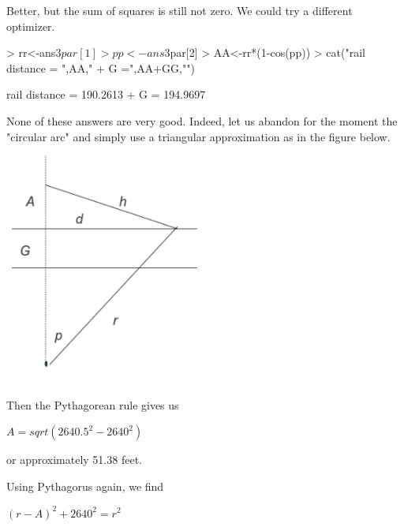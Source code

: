 \documentclass[11pt,letterpaper]{article}
\begin{document}
Better, but the sum of squares is still not zero. We could try a different optimizer.

\begin{Schunk}
\begin{Sinput}
> rr<-ans3$par[1]
> pp<-ans3$par[2]
> AA<-rr*(1-cos(pp)) 
> cat("rail distance = ",AA," + G =",AA+GG,"\n")
\end{Sinput}
\begin{Soutput}
rail distance =  190.2613  + G = 194.9697 
\end{Soutput}
\end{Schunk}

None of these answers are very good. Indeed, let us abandon for the moment the "circular
arc" and simply use a triangular approximation as in the figure below. 


\includegraphics[height=3in, width=2.6in]{onefootb.pdf}

Then the Pythagorean rule gives us 

$ A = sqrt(2640.5^2 - 2640^2) $

or approximately 51.38 feet. 

Using Pythagorus again, we find

$  (r-A)^2 + 2640^2 = r^2 $
\end{document}
